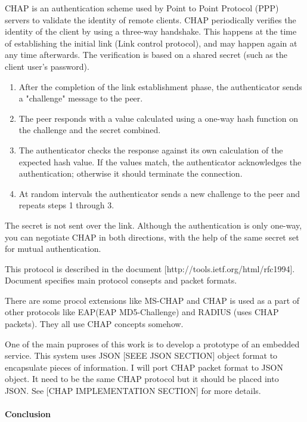 CHAP is an authentication scheme used by Point to Point Protocol (PPP) servers to validate the identity of remote clients. 
CHAP periodically verifies the identity of the client by using a three-way handshake. 
This happens at the time of establishing the initial link (Link control protocol), and may happen again at any time afterwards.
The verification is based on a shared secret (such as the client user's
password).
\begin{enumerate}
  \item After the completion of the link establishment phase, the authenticator
  sends a "challenge" message to the peer.
  \item The peer responds with a value calculated using a one-way hash function
  on the challenge and the secret combined.
  \item The authenticator checks the response against its own calculation of the
  expected hash value. If the values match, the authenticator acknowledges the authentication; otherwise it should terminate the connection.
  \item At random intervals the authenticator sends a new challenge to the peer
  and repeats steps 1 through 3.
\end{enumerate}

The secret is not sent over the link.
Although the authentication is only one-way, you can negotiate CHAP in both directions, 
with the help of the same secret set for mutual authentication.

This protocol is described in the document [http://tools.ietf.org/html/rfc1994].
Document specifies main protocol consepts and packet formats.

There are some procol extensions like MS-CHAP and CHAP is used
as a part of other protocols like EAP(EAP MD5-Challenge) and RADIUS (uses CHAP
packets). They all use CHAP concepts somehow. 

One of the main puproses of this work is to develop a prototype of an embedded
service. This system uses JSON [SEEE JSON SECTION] object format to encapsulate
pieces of information. I will port CHAP packet format to JSON object. It need to
be the same CHAP protocol but it should be placed into JSON. See
[CHAP IMPLEMENTATION SECTION] for more details.



\paragraph{Conclusion}

